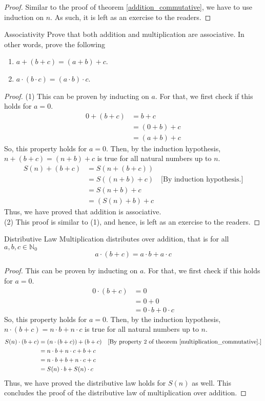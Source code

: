 \begin{proof}
	Similar to the proof of theorem \eqref{addition_commutative}, we have to use induction on $n$. As such, it is left as an exercise to the readers.
\end{proof}
\begin{Theorem}{Associativity}\label{associativity_addition_multiplication}
	Prove that both addition and multiplication are associative. In other words, prove the following
	\begin{enumerate}
		\item $a+(b+c)=(a+b)+c$.
		\item $a\cdot(b\cdot c)=(a\cdot b)\cdot c$.
	\end{enumerate}
\end{Theorem}
\begin{proof}
	(1) This can be proven by inducting on $a$. For that, we first check if this holds for $a=0$.
	\begin{align*}
		0+(b+c)&=b+c\\
		&=(0+b)+c\\
		&=(a+b)+c
	\end{align*}
	So, this property holds for $a=0$. Then, by the induction hypothesis, $n+(b+c)=(n+b)+c$ is true for all natural numbers up to $n$.
	\begin{align*}
		S(n)+(b+c)&=S(n+(b+c))\\
		&=S((n+b)+c)\quad\text{[By induction hypothesis.]}\\
		&=S(n+b)+c\\
		&=(S(n)+b)+c
	\end{align*}
	Thus, we have proved that addition is associative.\\
	(2) This proof is similar to (1), and hence, is left as an exercise to the readers.
\end{proof}
\begin{Theorem}{Distributive Law}\label{distributivity}
	Multiplication distributes over addition, that is for all $a,b,c\in\mathbb{N}_0$ $$a\cdot(b+c)=a\cdot b+a\cdot c$$
\end{Theorem}
\begin{proof}
	This can be proven by inducting on $a$. For that, we first check if this holds for $a=0$.
	\begin{align*}
		0\cdot(b+c)&=0\\
		&=0+0\quad\\
		&=0\cdot b+0\cdot c
	\end{align*}
	So, this property holds for $a=0$. Then, by the induction hypothesis, $n\cdot(b+c)=n\cdot b+n\cdot c$ is true for all natural numbers up to $n$.
	\begin{align*}
		S(n)\cdot(b+c)&=(n\cdot(b+c))+(b+c)\quad\text{[By property 2 of theorem \eqref{multiplication_commutative}.]}\\
		&=n\cdot b+n\cdot c+b+c\\
		&=n\cdot b+b+n\cdot c+c\\
		&=S(n)\cdot b+S(n)\cdot c
	\end{align*}
	Thus, we have proved the distributive law holds for $S(n)$ as well. This concludes the proof of the distributive law of multiplication over addition.
\end{proof}
